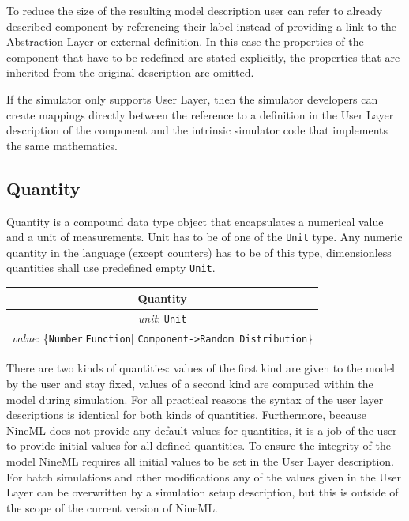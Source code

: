 \documentclass{article}
\begin{document}
To reduce the size of the resulting model description user can refer to
already described component by referencing their label instead of providing
a link to the Abstraction Layer or external definition. In this case the
properties of the component that have to be redefined are stated explicitly,
the properties that are inherited from the original description are omitted.

If the simulator only supports User Layer, then the simulator developers
can create mappings directly between the reference to a definition in the
User Layer description of the component and the intrinsic simulator code
that implements the same mathematics.

\subsection{Quantity}
\label{quantity}

Quantity is a compound data type object that encapsulates a numerical value
and a unit of measurements. Unit has to be of one of the {\tt Unit} type.
Any numeric quantity in the language (except counters) has to be of this type,
dimensionless quantities shall use predefined empty {\tt Unit}.

\begin{table}[htb]
\center
\begin{tabular}{|c|}
\hline
\hline
Quantity \\
\hline
\hline
{\em unit}: {\tt Unit} \\
\hline
{\em value}: \{{\tt Number}$|${\tt Function}$|$%
{\tt Component->Random Distribution}\} \\
\hline
\end{tabular}
\end{table}

There are two kinds of quantities: values of the first kind are given to the
model by the user and stay fixed, values of a second kind are computed within
the model during simulation. For all practical reasons the syntax of the user
layer descriptions is identical for both kinds of quantities. Furthermore,
because NineML does not provide any default values for quantities, it is a
job of the user to provide initial values for all defined quantities. To
ensure the integrity of the model NineML requires all initial values to be
set in the User Layer description. For batch simulations and other
modifications any of the values given in the User Layer can be overwritten
by a simulation setup description, but this is outside of the scope of the
current version of NineML.
\end{document}
